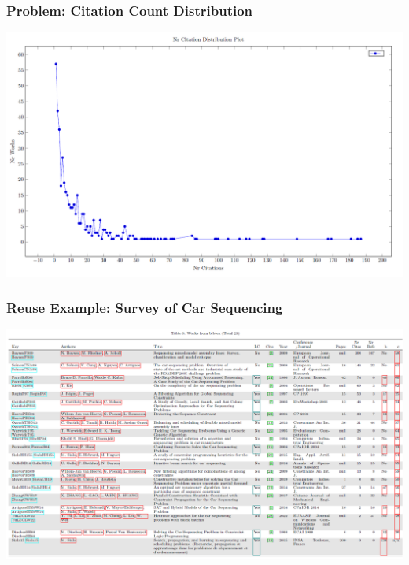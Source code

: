 \begin{frame}
\frametitle{Problem: Citation Count Distribution}
\includegraphics[width=.8\textwidth]{survey/citationcount}
\end{frame}

\begin{frame}
\frametitle{Reuse Example: Survey of Car Sequencing}
\includegraphics[width=\textwidth]{survey/carsequencing}
\end{frame}


